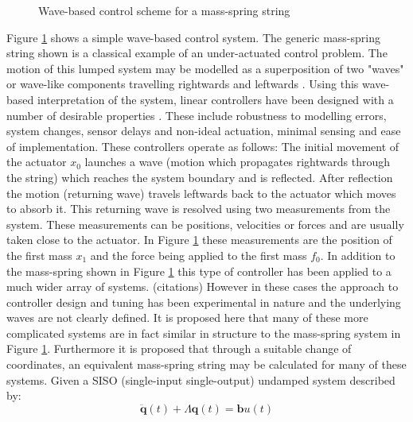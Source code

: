\documentclass{mbd_fullpaper}
\begin{document}
\begin{figure}[h]
  \begin{center}
    	
	\caption{Wave-based control scheme for a mass-spring string \label{fig:wave-based-control}}
  \end{center}
\end{figure}
Figure \ref{fig:wave-based-control} shows a simple wave-based control system.
The generic mass-spring string shown is a classical example of an under-actuated control problem.
The motion of this lumped system may be modelled as a superposition of two "waves" or wave-like components travelling rightwards and leftwards \cite{OConnor2011}.
Using this wave-based interpretation of the system, linear controllers have been designed with a number of desirable properties \cite{Connor2005}. 
These include robustness to modelling errors, system changes, sensor delays and non-ideal actuation, minimal sensing and ease of implementation.
These controllers operate as follows: The initial movement of the actuator $x_0$ launches a wave (motion which propagates rightwards through the string) which reaches the system boundary and is reflected.
After reflection the motion (returning wave) travels leftwards back to the actuator which moves to absorb it.
This returning wave is resolved using two measurements from the system.
These measurements can be positions, velocities or forces and are usually taken close to the actuator.
In Figure \ref{fig:wave-based-control} these measurements are the position of the first mass $x_1$ and the force being applied to the first mass $f_0$.
In addition to the mass-spring shown in Figure \ref{fig:wave-based-control} this type of controller has been applied to a much wider array of systems. (citations)
However in these cases the approach to controller design and tuning has been experimental in nature and the underlying waves are not clearly defined.
It is proposed here that many of these more complicated systems are in fact similar in structure to the mass-spring system in Figure \ref{fig:wave-based-control}.
Furthermore it is proposed that through a suitable change of coordinates, an equivalent mass-spring string may be calculated for many of these systems.
Given a SISO (single-input single-output) undamped system described by:
\begin{equation}
\ddot{\mathbf{q}}(t) + \Lambda\mathbf{q}(t) = \mathbf{b}u(t)
\label{eq:modal1}
\end{equation}
\end{document}
